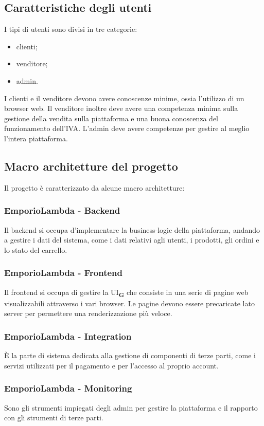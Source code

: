 \subsection{Caratteristiche degli utenti}
I tipi di utenti sono divisi in tre categorie:
\begin{itemize}
    \item clienti;
    \item venditore;
    \item admin.
\end{itemize}
I clienti e il venditore devono avere conoscenze minime, ossia l'utilizzo di un browser web. Il venditore inoltre deve avere una competenza minima sulla gestione della vendita sulla piattaforma e una buona conoscenza del funzionamento dell'IVA. L'admin deve avere competenze per gestire al meglio l'intera piattaforma.
\subsection{Macro architetture del progetto}
Il progetto è caratterizzato da alcune macro architetture:
\subsubsection{EmporioLambda - Backend}
Il backend si occupa d'implementare la business-logic della piattaforma, andando a gestire i dati del sistema, come i dati relativi agli utenti, i prodotti, gli ordini e lo stato del carrello.
\subsubsection{EmporioLambda - Frontend}
Il frontend si occupa di gestire la UI\textsubscript{\textbf{G}} che consiste in una serie di pagine web visualizzabili attraverso i vari browser. Le pagine devono essere precaricate lato server per permettere una renderizzazione più veloce.
\subsubsection{EmporioLambda - Integration}
È la parte di sistema dedicata alla gestione di componenti di terze parti, come i servizi utilizzati per il pagamento e per l'accesso al proprio account.
\subsubsection{EmporioLambda - Monitoring}
Sono gli strumenti impiegati degli admin per gestire la piattaforma e il rapporto con gli strumenti di terze parti.






